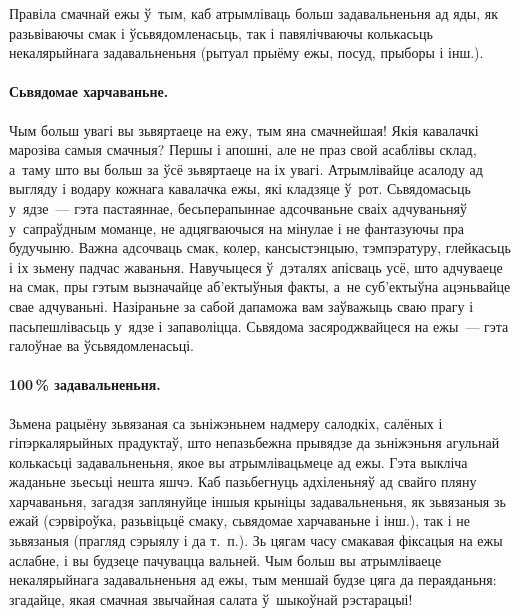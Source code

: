 Правіла смачнай ежы ў~тым, каб атрымліваць больш задавальненьня ад яды, як разьвіваючы смак і ўсьвядомленасьць, так і павялічваючы колькасьць некалярыйнага задавальненьня (рытуал прыёму ежы, посуд, прыборы і інш.).

\paragraph{Сьвядомае харчаваньне.}
Чым больш увагі вы зьвяртаеце на ежу, тым яна смачнейшая! Якія кавалачкі марозіва самыя смачныя? Першы і апошні, але не праз свой асаблівы склад, а~таму што вы больш за ўсё зьвяртаеце на іх увагі. Атрымлівайце асалоду ад выгляду і водару кожнага кавалачка ежы, які кладзяце ў~рот. Сьвядомасьць у~ядзе~--- гэта пастаяннае, бесьперапыннае адсочваньне сваіх адчуваньняў у~сапраўдным моманце, не адцягваючыся на мінулае і не фантазуючы пра будучыню. Важна адсочваць смак, колер, кансыстэнцыю, тэмпэратуру, глейкасьць і іх зьмену падчас жаваньня. Навучыцеся ў~дэталях апісваць усё, што адчуваеце на смак, пры гэтым вызначайце аб'ектыўныя факты, а~не суб'ектыўна ацэньвайце свае адчуваньні. Назіраньне за сабой дапаможа вам заўважыць сваю прагу і пасьпешлівасьць у~ядзе і запаволіцца. Сьвядома засяроджвайцеся на ежы~--- гэта галоўнае ва ўсьвядомленасьці.

\paragraph{100\,\% задавальненьня.}
Зьмена рацыёну зьвязаная са зьніжэньнем надмеру салодкіх, салёных і гіпэркалярыйных прадуктаў, што непазьбежна прывядзе да зьніжэньня агульнай колькасьці задавальненьня, якое вы атрымлівацьмеце ад ежы. Гэта выкліча жаданьне зьесьці нешта яшчэ. Каб пазьбегнуць адхіленьняў ад свайго пляну харчаваньня, загадзя заплянуйце іншыя крыніцы задавальненьня, як зьвязаныя зь ежай (сэрвіроўка, разьвіцьцё смаку, сьвядомае харчаваньне і інш.), так і не зьвязаныя (прагляд сэрыялу і да т.~п.). Зь цягам часу смакавая фіксацыя на ежы аслабне, і вы будзеце пачувацца вальней. Чым больш вы атрымліваеце некалярыйнага задавальненьня ад ежы, тым меншай будзе цяга да пераяданьня: згадайце, якая смачная звычайная салата ў~шыкоўнай рэстарацыі!

